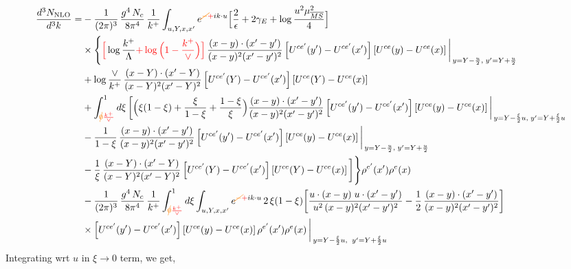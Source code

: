 \documentclass[9pt]{article}
\numberwithin{equation}{section}
\begin{document}
\begin{align}
\frac{d^{3}N_{\rm NLO}}{d^{3}k}= &-\frac{1}{(2\pi)^{3}}\,\frac{g^{4}\,N_{c}}{8\pi^{4}}\,\frac{1}{k^{+}}\int_{u,Y,x,x'}e^{{\color{orange}\cancel{-}}{\color{red}+}ik\cdot u}\Big[\frac{2}{\epsilon}+2\gamma_{E}+\log\frac{u^{2}\mu^{2}_{\overline{MS}}}{4}\Big]\notag\\
&\times\Bigg\{{\color{red}\Big[}\log\frac{k^{+}}{\Lambda}{\color{red}+\log\Big(1-\frac{k^{+}}{\vee}\Big)\Big]}\,\frac{(x-y)\cdot(x'-y')}{(x-y)^{2}(x'-y')^{2}}\left[U^{ce'}(y') - U^{ce'}(x')\right]\left[U^{ce}(y) - U^{ce}(x)\right]\bigg|_{\,y=Y-\frac{u}{2},\;y'=Y+\frac{u}{2}}\notag\\
&+\log\frac{\vee}{k^{+}}\,\frac{(x-Y)\cdot(x'-Y)}{(x-Y)^{2}(x'-Y)^{2}}\left[U^{ce'}(Y) - U^{ce'}(x')\right]\left[U^{ce}(Y) - U^{ce}(x)\right]\notag\\
&+\int_{{\color{orange}\cancel{0}}{\color{red}\frac{k^{+}}{\vee}}}^{1}d\xi\,\bigg[\Big(\xi(1-\xi)+\frac{\xi}{1-\xi}+\frac{1-\xi}{\xi}\Big)\frac{(x-y)\cdot(x'-y')}{(x-y)^{2}(x'-y')^{2}}\left[U^{ce'}(y') - U^{ce'}(x')\right]\left[U^{ce}(y) - U^{ce}(x)\right]\bigg|_{\,y=Y-\frac{\xi}{2}u,\;y'=Y+\frac{\xi}{2}u}\notag\\
&-\frac{1}{1-\xi}\,\frac{(x-y)\cdot(x'-y')}{(x-y)^{2}(x'-y')^{2}}\left[U^{ce'}(y') - U^{ce'}(x')\right]\left[U^{ce}(y) - U^{ce}(x)\right]\bigg|_{\,y=Y-\frac{u}{2},\;y'=Y+\frac{u}{2}}\notag\\
&-\frac{1}{\xi}\,\frac{(x-Y)\cdot(x'-Y)}{(x-Y)^{2}(x'-Y)^{2}}\left[U^{ce'}(Y) - U^{ce'}(x')\right]\left[U^{ce}(Y) - U^{ce}(x)\right]\bigg]\Bigg\}\rho^{e'}(x')\rho^{e}(x)\notag\\
&-\frac{1}{(2\pi)^{3}}\,\frac{g^{4}\,N_{c}}{8\pi^{4}}\,\frac{1}{k^{+}}\int_{{\color{orange}\cancel{0}}{\color{red}\frac{k^{+}}{\vee}}}^{1}d\xi\int_{u,Y,x,x'}e^{{\color{orange}\cancel{-}}{\color{red}+}ik\cdot u}\,2\,\xi(1-\xi)\bigg[\frac{u\cdot(x-y)\;u\cdot(x'-y')}{u^{2}\,(x-y)^{2}(x'-y')^{2}}-\frac{1}{2}\,\frac{(x-y)\cdot(x'-y')}{(x-y)^{2}(x'-y')^{2}}\bigg]\notag\\
&\times\left[U^{ce'}(y') - U^{ce'}(x')\right]\left[U^{ce}(y) - U^{ce}(x)\right]\rho^{e'}(x')\rho^{e}(x)\,\bigg|_{\,y=Y-\frac{\xi}{2}u,\;\;y'=Y+\frac{\xi}{2}u}
\end{align}
Integrating wrt $u$ in $\xi\to 0$ term, we get,
\end{document}
